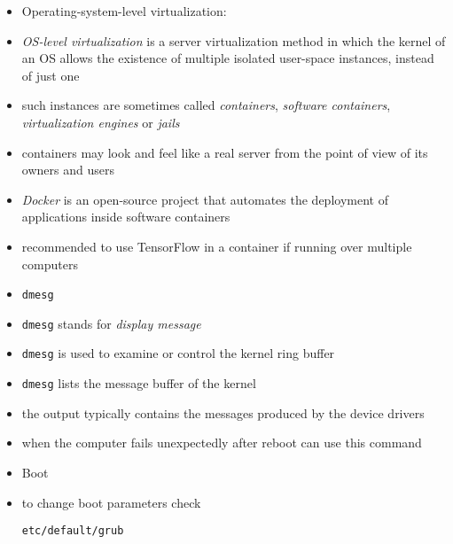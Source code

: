 \documentclass[twocolumn]{IEEEtran} %
\begin{document}
\begin{itemize}
    \ei
    \item Operating-system-level virtualization:
    \bi
        \item \emph{OS-level virtualization} is a server virtualization method in which the kernel of an OS allows the existence of multiple isolated user-space instances, instead of just one
        \item such instances are sometimes called \emph{containers}, \emph{software containers}, \emph{virtualization engines} or \emph{jails}
        \item containers may look and feel like a real server from the point of view of its owners and users
        \item \emph{Docker} is an open-source project that automates the deployment of applications inside software containers
        \item recommended to use TensorFlow in a container if running over multiple computers
    \ei
    \item \verb|dmesg|
	\bi
		\item \verb|dmesg| stands for \emph{display message}
        \item \verb|dmesg| is used to examine or control the kernel ring buffer
        \bi
		  \item \verb|dmesg| lists the message buffer of the kernel
        \ei 		
        \item the output typically contains the messages produced by the device drivers
        \item when the computer fails unexpectedly after reboot can use this command
	\ei
    \item Boot
    \bi
        \item to change boot parameters check
        \begin{verbatim}
etc/default/grub
        \end{verbatim}
    \ei
\end{itemize}

\newpage
\end{document}
